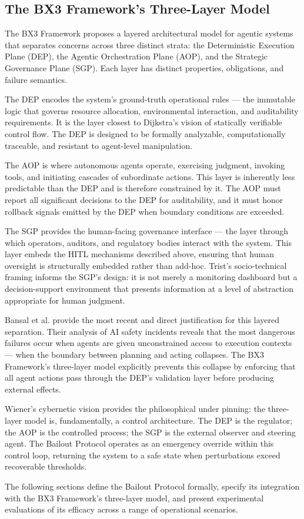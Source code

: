 \subsection{The BX3 Framework's Three-Layer Model}

The BX3 Framework proposes a layered architectural model for agentic systems that separates concerns across three distinct strata: the Deterministic Execution Plane (DEP), the Agentic Orchestration Plane (AOP), and the Strategic Governance Plane (SGP). Each layer has distinct properties, obligations, and failure semantics.

The DEP encodes the system's ground-truth operational rules — the immutable logic that governs resource allocation, environmental interaction, and auditability requirements. It is the layer closest to Dijkstra's \cite{dijkstra1982} vision of statically verifiable control flow. The DEP is designed to be formally analyzable, computationally traceable, and resistant to agent-level manipulation.

The AOP is where autonomous agents operate, exercising judgment, invoking tools, and initiating cascades of subordinate actions. This layer is inherently less predictable than the DEP and is therefore constrained by it. The AOP must report all significant decisions to the DEP for auditability, and it must honor rollback signals emitted by the DEP when boundary conditions are exceeded.

The SGP provides the human-facing governance interface — the layer through which operators, auditors, and regulatory bodies interact with the system. This layer embeds the HITL mechanisms described above, ensuring that human oversight is structurally embedded rather than add-hoc. Trist's \cite{tristr81} socio-technical framing informs the SGP's design: it is not merely a monitoring dashboard but a decision-support environment that presents information at a level of abstraction appropriate for human judgment.

Bansal et al. \cite{bansal2019} provide the most recent and direct justification for this layered separation. Their analysis of AI safety incidents reveals that the most dangerous failures occur when agents are given unconstrained access to execution contexts — when the boundary between planning and acting collapses. The BX3 Framework's three-layer model explicitly prevents this collapse by enforcing that all agent actions pass through the DEP's validation layer before producing external effects.

Wiener's cybernetic vision \cite{wiener1948} provides the philosophical under pinning: the three-layer model is, fundamentally, a control architecture. The DEP is the regulator; the AOP is the controlled process; the SGP is the external observer and steering agent. The Bailout Protocol operates as an emergency override within this control loop, returning the system to a safe state when perturbations exceed recoverable thresholds.

The following sections define the Bailout Protocol formally, specify its integration with the BX3 Framework's three-layer model, and present experimental evaluations of its efficacy across a range of operational scenarios.